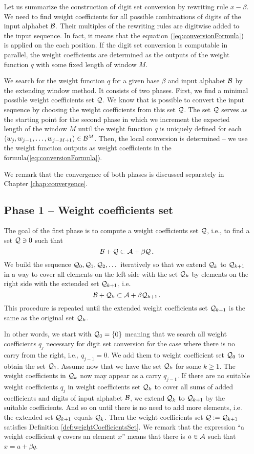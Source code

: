 Let us summarize the construction of digit set conversion by rewriting rule $x-\beta$. We need to find weight coefficients for all possible combinations of digits of the input alphabet $\mathcal{B}$. Their multiples of the rewriting rules are digitwise added to the input sequence. In fact, it means that the equation  (\ref{eq:conversionFormula}) is applied on the each position. If the digit set conversion is computable in parallel, the weight coefficients are determined as the outputs of the weight function $q$ with some fixed length of window $M$.  

We search for the weight function $q$ for a given base $\beta$ and input alphabet $\mathcal{B}$ by the extending window method. It consists of two phases. First, we find a minimal possible weight coefficients set $\mathcal{Q}$. We know that is possible to convert the input sequence by choosing the weight coefficients from this set $\mathcal{Q}$. The set $\mathcal{Q}$ serves as the starting point for the second phase in which we increment the expected length of the window $M$ until the weight function $q$ is uniquely defined for each $(w_j,w_{j-1}, \dots , w_{j-M+1}) \in \mathcal{B}^{M}$. Then, the local conversion is determined -- we use the weight function outputs as weight coefficients in the formula(\ref{eq:conversionFormula}).    

We remark that the convergence of both phases is discussed separately in Chapter \ref{chap:convergence}.

\subsection{Phase 1 -- Weight coefficients set}
\label{subsec:phase1}
The goal of the first phase is to compute a weight coefficients set $\mathcal{Q}$, i.e., to find a set $\mathcal{Q} \ni 0$ such that 
$$
    \mathcal{B} + \mathcal{Q} \subset \mathcal{A} + \beta \mathcal{Q}\,.
$$  
We build the sequence $\mathcal{Q}_0, \mathcal{Q}_1, \mathcal{Q}_2,\dots$ iteratively so that we extend $\mathcal{Q}_k$ to $\mathcal{Q}_{k+1}$ in a way to cover all elements on the left side with the set $\mathcal{Q}_k$ by elements on the right side with the extended set $\mathcal{Q}_{k+1}$, i.e.
$$
\mathcal{B}+ \mathcal{Q}_k \subset \mathcal{A} + \beta \mathcal{Q}_{k+1}\,.
$$
This procedure is repeated until the extended weight coefficients set $\mathcal{Q}_{k+1}$ is the same as the original set $\mathcal{Q}_{k}$. 

In other words, we start with $\mathcal{Q}_0=\{0\}$ meaning that we search all weight coefficients $q_j$ necessary for digit set conversion for the case where there is no carry from the right, i.e., $q_{j-1}=0$. We add them to weight coefficient set $\mathcal{Q}_0$ to obtain the set $\mathcal{Q}_1$. Assume now that we have the set $\mathcal{Q}_k$ for some $k\geq 1$. The weight coefficients in $\mathcal{Q}_k$ now may appear as a carry $q_{j-1}$. If there are no suitable weight coefficients $q_j$ in weight coefficients set $\mathcal{Q}_k$ to cover all sums of added coefficients and digits of input alphabet $\mathcal{B}$, we extend $\mathcal{Q}_k$ to $\mathcal{Q}_{k+1}$ by the suitable coefficients. And so on until there is no need to add more elements, i.e. the extended set $\mathcal{Q}_{k+1}$ equals $\mathcal{Q}_k$. Then the weight coefficients set $\mathcal{Q}:=\mathcal{Q}_{k+1}$ satisfies Definition \ref{def:weightCoefficientsSet}. We remark that the expression ``a weight coefficient $q$ covers an element $x$'' means that there is $a \in \mathcal{A}$ such that $x=a + \beta q$.
    
